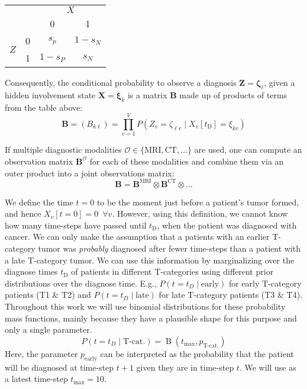 \documentclass[twocolumn]{aastex631}
\begin{document}
\noindent
\begin{center}
    \begin{tabular}{|cc|cc|}
        \hline
        & & \multicolumn{2}{c|}{$X$} \\
        & & 0 & 1 \\
        \hline
        \multirow{2}{*}{$Z$} & 0 & $s_p$ & $1 - s_N$ \\
        & 1 & $1 - s_P$ & $s_N$ \\
        \hline
    \end{tabular}
\end{center}

Consequently, the conditional probability to observe a diagnosis $\mathbf{Z}=\boldsymbol{\zeta}_\ell$, given a hidden involvement state $\mathbf{X}=\boldsymbol{\xi}_k$ is a matrix $\mathbf{B}$ made up of products of terms from the table above:
%
\begin{equation} \label{eq:transition_matrix}
    \mathbf{B} = \left( B_{k\ell} \right) = \prod_{v=1}^V P\left( Z_v = \zeta_{\ell v} \mid X_v[t_\text{D}] = \xi_{kv} \right)
\end{equation}

If multiple diagnostic modalities $\mathcal{O} \in \{ \text{MRI}, \text{CT}, \ldots \}$ are used, one can compute an observation matrix $\mathbf{B}^\mathcal{O}$ for each of these modalities and combine them via an outer product into a joint observations matrix:
%
\begin{equation}
    \mathbf{B} = \mathbf{B}^\text{MRI} \otimes \mathbf{B}^\text{CT} \otimes \ldots
\end{equation}

We define the time $t=0$ to be the moment just before a patient's tumor formed, and hence $X_v[t=0]=0 \,\,\, \forall v$. However, using this definition, we cannot know how many time-steps have passed until $t_\text{D}$, when the patient was diagnosed with cancer. We can only make the assumption that a patients with an earlier T-category tumor was \emph{probably} diagnosed after fewer time-steps than a patient with a late T-category tumor. We can use this information by marginalizing over the diagnose times $t_\text{D}$ of patients in different T-categories using different prior distributions over the diagnose time. E.g., $P \left( t=t_D \mid \text{early} \right)$ for early T-category patients (T1 \& T2) and $P \left( t=t_D \mid \text{late} \right)$ for late T-category patients (T3 \& T4). Throughout this work we will use binomial distributions for these probability mass functions, mainly because they have a plausible shape for this purpose and only a single parameter.
%
\begin{equation}
    P \left( t = t_D \mid \text{T-cat.} \right) = \operatorname{B}(t_\text{max},p_\text{T-cat.})
\end{equation}
%
Here, the parameter $p_\text{early}$ can be interpreted as the probability that the patient will be diagnosed at time-step $t+1$ given they are in time-step $t$. We will use as a latest time-step $t_\text{max} = 10$.
\end{document}

